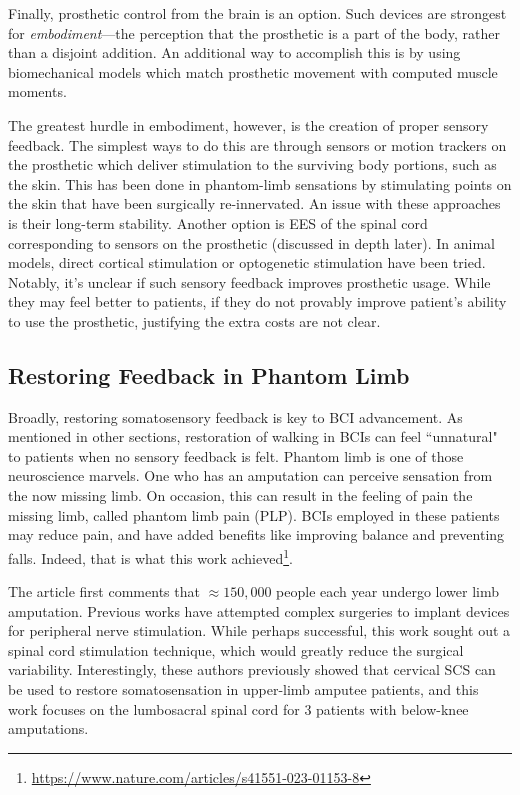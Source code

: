 Finally, prosthetic control from the brain is an option. Such devices are strongest for \textit{embodiment}---the perception that the prosthetic is a part of the body, rather than a disjoint addition. An additional way to accomplish this is by using biomechanical models which match prosthetic movement with computed muscle moments.\newline

The greatest hurdle in embodiment, however, is the creation of proper sensory feedback. The simplest ways to do this are through sensors or motion trackers on the prosthetic which deliver stimulation to the surviving body portions, such as the skin. This has been done in phantom-limb sensations by stimulating points on the skin that have been surgically re-innervated. An issue with these approaches is their long-term stability. Another option is EES of the spinal cord corresponding to sensors on the prosthetic (discussed in depth later). In animal models, direct cortical stimulation or optogenetic stimulation have been tried. Notably, it's unclear if such sensory feedback improves prosthetic usage. While they may feel better to patients, if they do not provably improve patient's ability to use the prosthetic, justifying the extra costs are not clear. 


\subsection{Restoring Feedback in Phantom Limb}

Broadly, restoring somatosensory feedback is key to BCI advancement. As mentioned in other sections, restoration of walking in BCIs can feel ``unnatural" to patients when no sensory feedback is felt. Phantom limb is one of those neuroscience marvels. One who has an amputation can perceive sensation from the now missing limb. On occasion, this can result in the feeling of pain the missing limb, called phantom limb pain (PLP). BCIs employed in these patients may reduce pain, and have added benefits like improving balance and preventing falls. Indeed, that is what this work achieved\footnote{\url{https://www.nature.com/articles/s41551-023-01153-8}}.\newline

The article first comments that $\approx 150,000$ people each year undergo lower limb amputation. Previous works have attempted complex surgeries to implant devices for peripheral nerve stimulation. While perhaps successful, this work sought out a spinal cord stimulation technique, which would greatly reduce the surgical variability. Interestingly, these authors previously showed that cervical SCS can be used to restore somatosensation in upper-limb amputee patients, and this work focuses on the lumbosacral spinal cord for 3 patients with below-knee amputations.\newline

